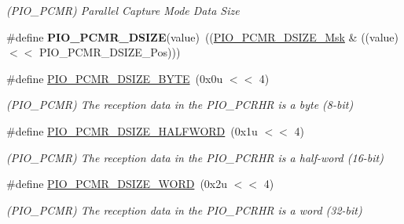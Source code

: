 \begin{DoxyCompactItemize}
\begin{DoxyCompactList}\small\item\em (P\+I\+O\+\_\+\+P\+C\+MR) Parallel Capture Mode Data Size \end{DoxyCompactList}\item 
\mbox{\label{group__SAMV71__PIO_gabd8901cde7ccefb6bcd8d366ae9692aa}} 
\#define {\bfseries P\+I\+O\+\_\+\+P\+C\+M\+R\+\_\+\+D\+S\+I\+ZE}(value)~((\mbox{\hyperlink{group__SAMV71__PIO_ga2405d9e99652a4ecd89f8aae58936552}{P\+I\+O\+\_\+\+P\+C\+M\+R\+\_\+\+D\+S\+I\+Z\+E\+\_\+\+Msk}} \& ((value) $<$$<$ P\+I\+O\+\_\+\+P\+C\+M\+R\+\_\+\+D\+S\+I\+Z\+E\+\_\+\+Pos)))
\item 
\mbox{\label{group__SAMV71__PIO_ga58fa641ebec8ba9352805d5462f5fe93}} 
\#define \mbox{\hyperlink{group__SAMV71__PIO_ga58fa641ebec8ba9352805d5462f5fe93}{P\+I\+O\+\_\+\+P\+C\+M\+R\+\_\+\+D\+S\+I\+Z\+E\+\_\+\+B\+Y\+TE}}~(0x0u $<$$<$ 4)
\begin{DoxyCompactList}\small\item\em (P\+I\+O\+\_\+\+P\+C\+MR) The reception data in the P\+I\+O\+\_\+\+P\+C\+R\+HR is a byte (8-\/bit) \end{DoxyCompactList}\item 
\mbox{\label{group__SAMV71__PIO_gab0a769e5a2e8db0ddb7a90c46605bbc7}} 
\#define \mbox{\hyperlink{group__SAMV71__PIO_gab0a769e5a2e8db0ddb7a90c46605bbc7}{P\+I\+O\+\_\+\+P\+C\+M\+R\+\_\+\+D\+S\+I\+Z\+E\+\_\+\+H\+A\+L\+F\+W\+O\+RD}}~(0x1u $<$$<$ 4)
\begin{DoxyCompactList}\small\item\em (P\+I\+O\+\_\+\+P\+C\+MR) The reception data in the P\+I\+O\+\_\+\+P\+C\+R\+HR is a half-\/word (16-\/bit) \end{DoxyCompactList}\item 
\mbox{\label{group__SAMV71__PIO_ga3865149254b070ed5199460818be435c}} 
\#define \mbox{\hyperlink{group__SAMV71__PIO_ga3865149254b070ed5199460818be435c}{P\+I\+O\+\_\+\+P\+C\+M\+R\+\_\+\+D\+S\+I\+Z\+E\+\_\+\+W\+O\+RD}}~(0x2u $<$$<$ 4)
\begin{DoxyCompactList}\small\item\em (P\+I\+O\+\_\+\+P\+C\+MR) The reception data in the P\+I\+O\+\_\+\+P\+C\+R\+HR is a word (32-\/bit) \end{DoxyCompactList}\item 

\end{DoxyCompactItemize}
